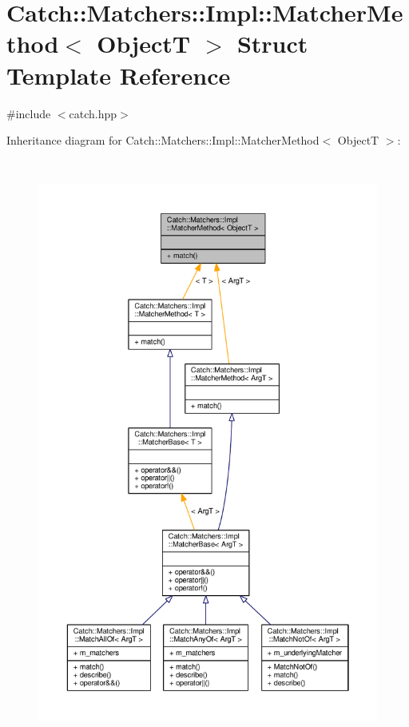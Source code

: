 \hypertarget{struct_catch_1_1_matchers_1_1_impl_1_1_matcher_method}{\section{Catch\-:\-:Matchers\-:\-:Impl\-:\-:Matcher\-Method$<$ Object\-T $>$ Struct Template Reference}
\label{struct_catch_1_1_matchers_1_1_impl_1_1_matcher_method}
}


{\ttfamily \#include $<$catch.\-hpp$>$}



Inheritance diagram for Catch\-:\-:Matchers\-:\-:Impl\-:\-:Matcher\-Method$<$ Object\-T $>$\-:
\nopagebreak
\begin{figure}[H]
\begin{center}
\leavevmode
\includegraphics[height=550pt]{struct_catch_1_1_matchers_1_1_impl_1_1_matcher_method__inherit__graph}
\end{center}
\end{figure}


